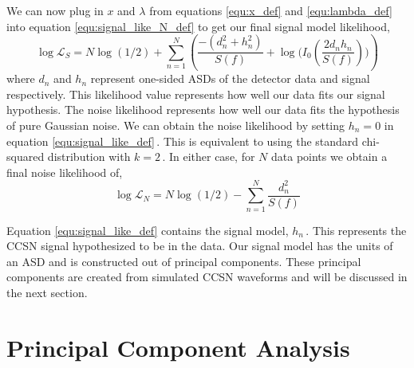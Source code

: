 We can now plug in $x$ and $\lambda$ from equations \ref{equ:x_def} and \ref{equ:lambda_def} into equation \ref{equ:signal_like_N_def} to get our final signal model likelihood,
\begin{equation}
\label{equ:signal_like_def}
    \log \mathcal{L}_{S} = N\log(1/2) + \sum_{n=1}^{N} \left( \frac{-(d_{n}^{2} + h_{n}^{2})}{S(f)} + \log\Big(I_0(\frac{2 d_{n} h_{n}}{S(f)})\Big) \right)
\end{equation}
where $d_{n}$ and $h_{n}$ represent one-sided ASDs of the detector data and signal respectively. This likelihood value represents how well our data fits our signal hypothesis. The noise likelihood represents how well our data fits the hypothesis of pure Gaussian noise. We can obtain the noise likelihood by setting $h_{n} = 0$ in equation \ref{equ:signal_like_def}\,. This is equivalent to using the standard chi-squared distribution with $k = 2\,$. In either case, for $N$ data points we obtain a final noise likelihood of,
\begin{equation}
\label{equ:noise_like_def}
    \log \mathcal{L}_{N} = N\log(1/2) - \sum_{n=1}^{N} \frac{d_{n}^{2}}{S(f)}
\end{equation}

Equation \ref{equ:signal_like_def} contains the signal model, $h_{n}\,$. This represents the CCSN signal hypothesized to be in the data. Our signal model has the units of an ASD and is constructed out of principal components. These principal components are created from simulated CCSN waveforms and will be discussed in the next section.

\section{Principal Component Analysis}
\label{sec:PCA}

